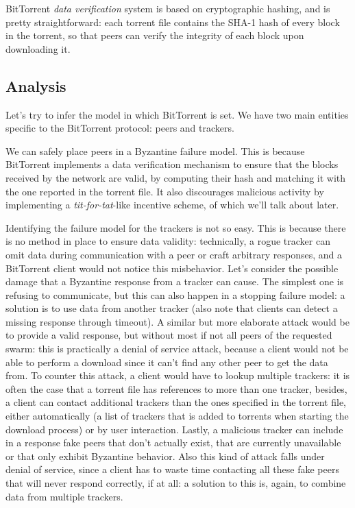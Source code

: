 \documentclass[mscthesis]{usiinfthesis}
\begin{document}
BitTorrent \emph{data verification} system is based on cryptographic hashing, and is pretty straightforward: each torrent file contains the SHA-1 hash of every block in the torrent, so that peers can verify the integrity of each block upon downloading it.

\subsection{Analysis}\label{sec:btanalysis}
Let's try to infer the model in which BitTorrent is set. We have two main entities specific to the BitTorrent protocol: peers and trackers. 

We can safely place peers in a Byzantine failure model. This is because BitTorrent implements a data verification mechanism to ensure that the blocks received by the network are valid, by computing their hash and matching it with the one reported in the torrent file. It also discourages malicious activity by implementing a \textit{tit-for-tat}-like incentive scheme, of which we'll talk about later.

Identifying the failure model for the trackers is not so easy. This is because there is no method in place to ensure data validity: technically, a rogue tracker can omit data during communication with a peer or craft arbitrary responses, and a BitTorrent client would not notice this misbehavior. Let's consider the possible damage that a Byzantine response from a tracker can cause. The simplest one is refusing to communicate, but this can also happen in a stopping failure model: a solution is to use data from another tracker (also note that clients can detect a missing response through timeout). A similar but more elaborate attack would be to provide a valid response, but without most if not all peers of the requested swarm: this is practically a denial of service attack, because a client would not be able to perform a download since it can't find any other peer to get the data from. To counter this attack, a client would have to lookup multiple trackers: it is often the case that a torrent file has references to more than one tracker, besides, a client can contact additional trackers than the ones specified in the torrent file, either automatically (a list of trackers that is added to torrents when starting the download process) or by user interaction. Lastly, a malicious tracker can include in a response fake peers that don't actually exist, that are currently unavailable or that only exhibit Byzantine behavior. Also this kind of attack falls under denial of service, since a client has to waste time contacting all these fake peers that will never respond correctly, if at all: a solution to this is, again, to combine data from multiple trackers.
\end{document}
